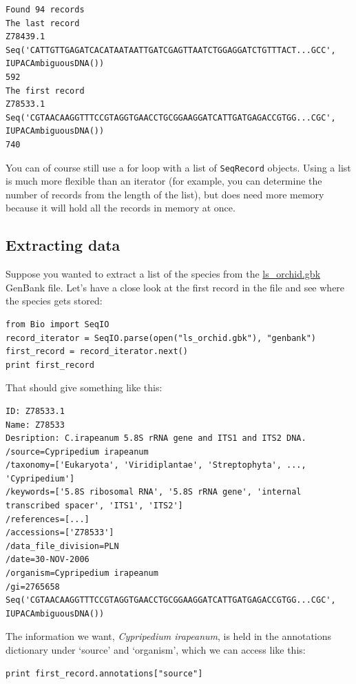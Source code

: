 \documentclass{report}
\begin{document}
\begin{verbatim}
Found 94 records
The last record
Z78439.1
Seq('CATTGTTGAGATCACATAATAATTGATCGAGTTAATCTGGAGGATCTGTTTACT...GCC', IUPACAmbiguousDNA())
592
The first record
Z78533.1
Seq('CGTAACAAGGTTTCCGTAGGTGAACCTGCGGAAGGATCATTGATGAGACCGTGG...CGC', IUPACAmbiguousDNA())
740
\end{verbatim}

You can of course still use a for loop with a list of \verb|SeqRecord| objects.  Using a list is much more flexible than an iterator (for example, you can determine the number of records from the length of the list), but does need more memory because it will hold all the records in memory at once.

\subsection{Extracting data}

Suppose you wanted to extract a list of the species from the \href{http://biopython.org/DIST/docs/tutorial/examples/ls_orchid.gbk}{ls\_orchid.gbk} GenBank file.  Let's have a close look at the first record in the file and see where the species gets stored:

\begin{verbatim}
from Bio import SeqIO
record_iterator = SeqIO.parse(open("ls_orchid.gbk"), "genbank")
first_record = record_iterator.next()
print first_record
\end{verbatim}

\noindent That should give something like this:

\begin{verbatim}
ID: Z78533.1
Name: Z78533
Desription: C.irapeanum 5.8S rRNA gene and ITS1 and ITS2 DNA.
/source=Cypripedium irapeanum
/taxonomy=['Eukaryota', 'Viridiplantae', 'Streptophyta', ..., 'Cypripedium']
/keywords=['5.8S ribosomal RNA', '5.8S rRNA gene', 'internal transcribed spacer', 'ITS1', 'ITS2']
/references=[...]
/accessions=['Z78533']
/data_file_division=PLN
/date=30-NOV-2006
/organism=Cypripedium irapeanum
/gi=2765658
Seq('CGTAACAAGGTTTCCGTAGGTGAACCTGCGGAAGGATCATTGATGAGACCGTGG...CGC', IUPACAmbiguousDNA())
\end{verbatim}

\noindent The information we want, \emph{Cypripedium irapeanum}, is held in the annotations dictionary under `source' and `organism', which we can access like this:

\begin{verbatim}
print first_record.annotations["source"]
\end{verbatim}
\end{document}
